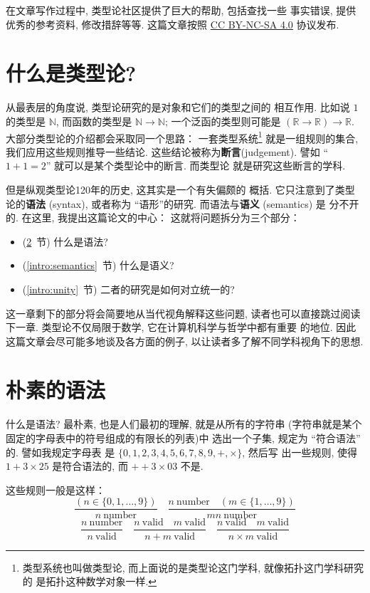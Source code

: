 在文章写作过程中, 类型论社区提供了巨大的帮助, 包括查找一些
事实错误, 提供优秀的参考资料, 修改措辞等等. 这篇文章按照
\href{https://creativecommons.org/licenses/by-nc-sa/4.0/legalcode}{CC BY-NC-SA 4.0} 协议发布.

\section{什么是类型论?}
从最表层的角度说, 类型论研究的是对象和它们的类型之间的
相互作用. 比如说 \(1\) 的类型是 \(\mathbb N\),
而函数的类型是 \(\mathbb N \to \mathbb N\);
一个泛函的类型则可能是
\((\mathbb R \to \mathbb R) \to \mathbb R\).
大部分类型论的介绍都会采取同一个思路：
一套类型系统\footnote{类型系统也叫做类型论,
而上面说的是类型论这门学科, 就像拓扑这门学科研究的
是拓扑这种数学对象一样.}%
就是一组规则的集合, 我们应用这些规则推导一些结论.
这些结论被称为\textbf{断言}(judgement). 譬如
“\(1+1=2\)” 就可以是某个类型论中的断言. 而类型论
就是研究这些断言的学科.

但是纵观类型论120年的历史, 这其实是一个有失偏颇的
概括. 它只注意到了类型论的\textbf{语法} (syntax), 或者称为
“语形”的研究. 而语法与\textbf{语义} (semantics) 是
分不开的. 在这里, 我提出这篇论文的中心：
这就将问题拆分为三个部分：
\begin{itemize}
\item (\ref{intro:syntax}~节) 什么是语法?
\item (\ref{intro:semantics}~节) 什么是语义?
\item (\ref{intro:unity}~节) 二者的研究是如何对立统一的?
\end{itemize}
这一章剩下的部分将会简要地从当代视角解释这些问题,
读者也可以直接跳过阅读下一章.
类型论不仅局限于数学, 它在计算机科学与哲学中都有重要
的地位. 因此这篇文章会尽可能多地谈及各方面的例子,
以让读者多了解不同学科视角下的思想.

\section{朴素的语法}\label{intro:syntax}

什么是语法? 最朴素, 也是人们最初的理解, 就是从所有的字符串
(字符串就是某个固定的字母表中的符号组成的有限长的列表)中
选出一个子集, 规定为 “符合语法” 的. 譬如我规定字母表
是 \(\{0,1,2,3,4,5,6,7,8,9,+,\times\}\), 然后写
出一些规则, 使得 \(1 + 3 \times 25\) 是符合语法的,
而 \(++3\times 03\) 不是.

这些规则一般是这样：
\[
\frac{(n \in \{0,1,\dots,9\})}{n~\textrm{number}}\quad
\frac{n~\textrm{number}\quad (m \in \{1,\dots,9\})}{mn~\textrm{number}}
\]
\[
\frac{n~\text{number}}{n~\text{valid}}\quad
\frac{n~\text{valid}\quad m~\text{valid}}{n+m~\text{valid}}\quad
\frac{n~\text{valid}\quad m~\text{valid}}{n\times m~\text{valid}}
\]


